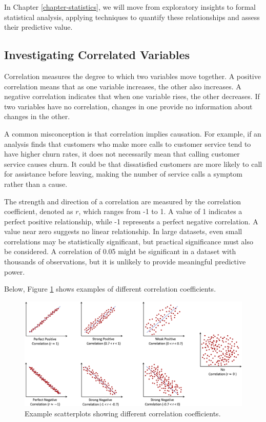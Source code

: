 \documentclass[
]{book}
\theoremstyle{definition}
\theoremstyle{definition}
\theoremstyle{definition}
\theoremstyle{definition}
\theoremstyle{remark}
\begin{document}
In Chapter \ref{chapter-statistics}, we will move from exploratory insights to formal statistical analysis, applying techniques to quantify these relationships and assess their predictive value.

\subsection{Investigating Correlated Variables}\label{investigating-correlated-variables}

Correlation measures the degree to which two variables move together. A positive correlation means that as one variable increases, the other also increases. A negative correlation indicates that when one variable rises, the other decreases. If two variables have no correlation, changes in one provide no information about changes in the other.

A common misconception is that correlation implies causation. For example, if an analysis finds that customers who make more calls to customer service tend to have higher churn rates, it does not necessarily mean that calling customer service causes churn. It could be that dissatisfied customers are more likely to call for assistance before leaving, making the number of service calls a symptom rather than a cause.

The strength and direction of a correlation are measured by the correlation coefficient, denoted as \(r\), which ranges from -1 to 1. A value of 1 indicates a perfect positive relationship, while -1 represents a perfect negative correlation. A value near zero suggests no linear relationship. In large datasets, even small correlations may be statistically significant, but practical significance must also be considered. A correlation of 0.05 might be significant in a dataset with thousands of observations, but it is unlikely to provide meaningful predictive power.

Below, Figure \ref{fig:correlation} shows examples of different correlation coefficients.

\begin{figure}

{\centering \includegraphics[width=1\linewidth]{images/ch4_correlation} 

}

\caption{Example scatterplots showing different correlation coefficients.}\label{fig:correlation}
\end{figure}
\end{document}
